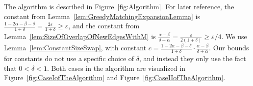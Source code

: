 The algorithm is described in Figure~\ref{fig:Algorithm}. For later reference, 
 the constant from Lemma~\ref{lem:GreedyMatchingExpansionLemma} is 
 $\frac{1-2\alpha-\beta - \delta}{1+\delta} = \frac{2\varepsilon}{1+\delta}\geq  \varepsilon$, and 
the constant from Lemma~\ref{lem:SizeOfOverlapOfNewEdgesWithM} is 
$\frac{\alpha -\beta}{\delta + \alpha} = \frac{\varepsilon}{2(1+\delta)}  \geq \varepsilon/4$.
We use Lemma~\ref{lem:ConstantSizeSwap}, with constant
$c = \frac{1-2\alpha-\beta -\delta}{1+\delta} \cdot \frac{\alpha - \beta}{\delta+\alpha}$. 
Our bounds for constants do not use a specific choice of $\delta$, 
and instead they only use the fact that $0 < \delta <1$.
Both cases in the algorithm are visualized in Figure~\ref{fig:CaseIofTheAlgorithm} and
Figure~\ref{fig:CaseIIofTheAlgorithm}.


